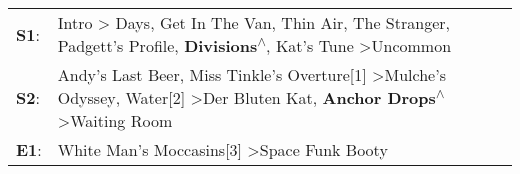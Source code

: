 \begin{supertabular}{p{0.03\textwidth}p{0.92\textwidth}}
 \textbf{S1}:  &  Intro\textsuperscript{} \textgreater {} Days\textsuperscript{}, \enspace Get In The Van\textsuperscript{}, \enspace Thin Air\textsuperscript{}, \enspace The Stranger\textsuperscript{}, \enspace Padgett's Profile\textsuperscript{}, \enspace \textbf{Divisions\textsuperscript{$\wedge$}}, \enspace Kat's Tune\textsuperscript{} \textgreater \enspace Uncommon\textsuperscript{}  \enspace  \\
 \textbf{S2}:  &                                   Andy's Last Beer\textsuperscript{}, \enspace Miss Tinkle's Overture[1]\textsuperscript{} \textgreater \enspace Mulche's Odyssey\textsuperscript{}, \enspace Water[2]\textsuperscript{} \textgreater \enspace Der Bluten Kat\textsuperscript{}, \enspace \textbf{Anchor Drops\textsuperscript{$\wedge$}} \textgreater \enspace Waiting Room\textsuperscript{}  \enspace  \\
 \textbf{E1}:  &                                                                                                                                                                                                                                                                                            White Man's Moccasins[3]\textsuperscript{} \textgreater \enspace Space Funk Booty\textsuperscript{}  \enspace  \\
\end{supertabular}
